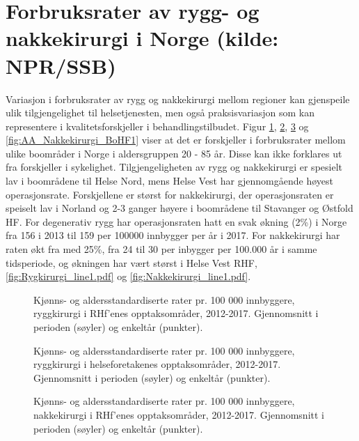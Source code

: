 \section{Forbruksrater av rygg- og nakkekirurgi i Norge (kilde: NPR/SSB)}
Variasjon i forbruksrater av rygg og nakkekirurgi mellom regioner kan 
gjenspeile ulik tilgjengelighet til helsetjenesten, men også praksisvariasjon som kan
representere i kvalitetsforskjeller i behandlingstilbudet. Figur \ref{fig:AA_Ryggkirurgi_BoRHF1}, \ref{fig:AA_Ryggkirurgi_BoHF1}, \ref{fig:AA_Nakkekirurgi_BoRHF1} og \ref{fig:AA_Nakkekirurgi_BoHF1} viser at det
er forskjeller i forbruksrater mellom ulike boområder i Norge i aldersgruppen 20 - 85 år. Disse kan ikke
forklares ut fra forskjeller i sykelighet. Tilgjengeligheten av rygg og nakkekirurgi er spesielt lav i boområdene til
Helse Nord, mens Helse Vest har gjennomgående høyest operasjonsrate. Forskjellene er størst for nakkekirurgi, der operasjonsraten er speiselt lav i Norland og 2-3 ganger høyere i boområdene til Stavanger og Østfold HF.
For degenerativ rygg har operasjonsraten hatt en svak økning (2\%) i Norge fra 156 i 2013  til 159 per 100000 innbygger per år i 2017. For nakkekirurgi har raten økt fra med 25\%, fra 24 til 30 per inbygger per 100.000 år i samme tidsperiode, og økningen har vært størst i Helse Vest RHF, \ref{fig:Rygkirurgi_line1.pdf} og \ref{fig:Nakkekirurgi_line1.pdf}.
 
\begin{figure}[ht]
\caption{Kjønns- og aldersstandardiserte rater pr. 100 000 innbyggere, ryggkirurgi i RHf’enes opptaksområder, 2012-2017. Gjennomsnitt i perioden (søyler) og enkeltår (punkter).}
\label{fig:AA_Ryggkirurgi_BoRHF1}
\end{figure}

\begin{figure}[ht]
\caption{Kjønns- og aldersstandardiserte rater pr. 100 000 innbyggere, ryggkirurgi i helseforetakenes opptaksområder, 2012-2017. Gjennomsnitt i perioden (søyler) og enkeltår (punkter).}
\label{fig:AA_Ryggkirurgi_BoHF1}
\end{figure}


\begin{figure}[ht]
\caption{Kjønns- og aldersstandardiserte rater pr. 100 000 innbyggere, nakkekirurgi i RHf’enes opptaksområder, 2012-2017. Gjennomsnitt i perioden (søyler) og enkeltår (punkter).}
\label{fig:AA_Nakkekirurgi_BoRHF1}
\end{figure}

